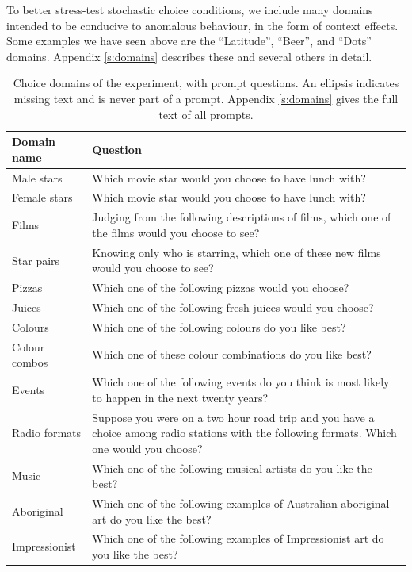 \documentclass[11pt,letter]{article}
\begin{document}
To better stress-test stochastic choice conditions, we include many  domains intended to be conducive to anomalous behaviour, in the form of context effects.
Some examples we have seen above are the ``Latitude'', ``Beer'', and ``Dots'' domains.
Appendix \ref{s:domains} describes these and several others in detail.

\begin{table}[h!]
  \centering
  \caption{Choice domains of the experiment, with prompt questions. An ellipsis indicates missing text and is never part of a prompt. Appendix \ref{s:domains} gives the full text of all prompts.}
  \label{t:domains}
  \begin{small}
    \begin{tabular}{lp{12cm}}
      Domain name & Question\\
      \hline
      Male stars & Which movie star would you choose to have lunch with? \\
      Female stars & Which movie star would you choose to have lunch with? \\
      Films & Judging from the following descriptions of films, which one of the films would you choose to see? \\
      Star pairs & Knowing only who is starring, which one of these new films would you choose to see? \\
      Pizzas & Which one of the following pizzas would you choose? \\
      Juices & Which one of the following fresh juices would you choose? \\
      Colours & Which one of the following colours do you like best? \\
      Colour combos & Which one of these colour combinations do you like best? \\
      Events & Which one of the following events do you think is most likely to happen in the next twenty years? \\
      Radio formats & Suppose you were on a two hour road trip and you have a choice among radio stations with the following formats.
Which one would you choose? \\
      Music & Which one of the following musical artists do you like the best? \\
      Aboriginal & Which one of the following examples of Australian aboriginal art do you like the best? \\
      Impressionist & Which one of the following examples of Impressionist art do you like the best? \\

\end{tabular}
\end{small}
\end{table}
\end{document}
